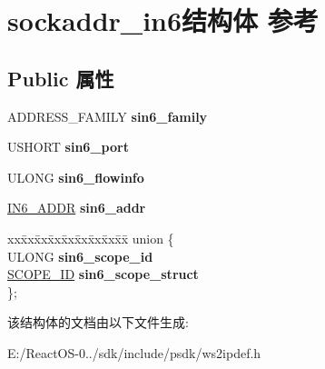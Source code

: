 \hypertarget{structsockaddr__in6}{}\section{sockaddr\+\_\+in6结构体 参考}
\label{structsockaddr__in6}
\subsection*{Public 属性}
\begin{DoxyCompactItemize}
\item 
\mbox{\label{structsockaddr__in6_a345f26bf338e84fd2489e3848e07e545}} 
A\+D\+D\+R\+E\+S\+S\+\_\+\+F\+A\+M\+I\+LY {\bfseries sin6\+\_\+family}
\item 
\mbox{\label{structsockaddr__in6_ae45ff4d84432f86536d899ea350a5c5d}} 
U\+S\+H\+O\+RT {\bfseries sin6\+\_\+port}
\item 
\mbox{\label{structsockaddr__in6_a0b3659da98ff8807204115e6634af2f2}} 
U\+L\+O\+NG {\bfseries sin6\+\_\+flowinfo}
\item 
\mbox{\label{structsockaddr__in6_a4cb9c77418920113e264fed08adfc07f}} 
\hyperlink{structin6__addr}{I\+N6\+\_\+\+A\+D\+DR} {\bfseries sin6\+\_\+addr}
\item 
\mbox{\label{structsockaddr__in6_ae604a51fee81185cbc646f0bc082a0f7}} 
\begin{tabbing}
xx\=xx\=xx\=xx\=xx\=xx\=xx\=xx\=xx\=\kill
union \{\\
\>ULONG {\bfseries sin6\_scope\_id}\\
\>\hyperlink{struct_s_c_o_p_e___i_d}{SCOPE\_ID} {\bfseries sin6\_scope\_struct}\\
\}; \\

\end{tabbing}\end{DoxyCompactItemize}


该结构体的文档由以下文件生成\+:\begin{DoxyCompactItemize}
\item 
E\+:/\+React\+O\+S-\/0../sdk/include/psdk/ws2ipdef.\+h\end{DoxyCompactItemize}
